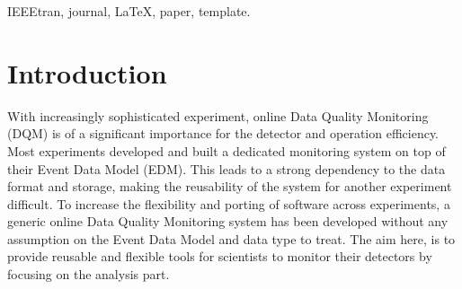 \documentclass[conference]{IEEEtran}
\begin{document}




\maketitle


\begin{abstract}
\blindtext[1]
\end{abstract}

\begin{IEEEkeywords}
IEEEtran, journal, \LaTeX, paper, template.
\end{IEEEkeywords}






%
\IEEEpeerreviewmaketitle



\section{Introduction}
With increasingly sophisticated experiment, online Data Quality Monitoring (DQM) is of a significant importance for the detector and operation efficiency. Most experiments developed and built a dedicated monitoring system on top of their Event Data Model (EDM). This leads to a strong dependency to the data format and storage, making the reusability of the system for another experiment difficult. To increase the flexibility and porting of software across experiments, a generic online Data Quality Monitoring system has been developed without any assumption on the Event Data Model and data type to treat. The aim here, is to provide reusable and flexible tools for scientists to monitor their detectors by focusing on the analysis part.
\end{document}
